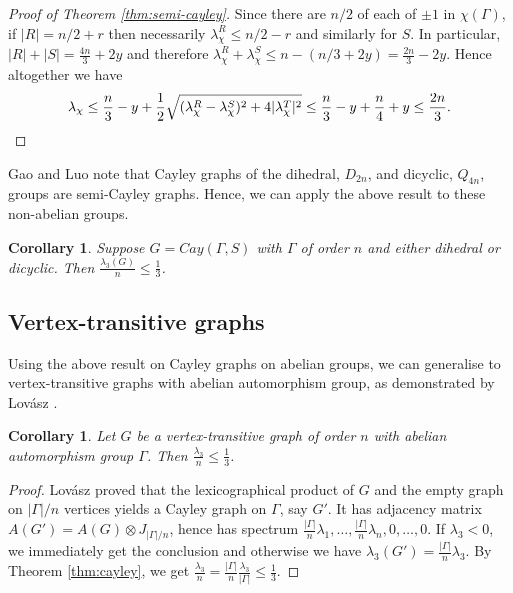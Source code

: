 \documentclass[12pt]{article}
\newtheorem{cor}[thm]{Corollary}
\begin{document}
\begin{proof}[Proof of Theorem \ref{thm:semi-cayley}]
    Since there are $n/2$ of each of $\pm 1$ in $\chi(\Gamma)$, if $|R| = n/2+r$ then necessarily $\lambda_\chi^R \le n/2-r$ and similarly for $S$. In particular, $|R| + |S| = \frac{4n}{3} + 2y$ and therefore $\lambda_\chi^R + \lambda_\chi^S \le n - (n/3 + 2y) = \frac{2n}{3} - 2y$. Hence altogether we have
    \[\lambda_\chi \le \frac{n}{3} - y + \frac12 \sqrt{(\lambda_\chi^R - \lambda_\chi^S)^2 + 4|\lambda_\chi^T|^2} \le \frac{n}{3} - y + \frac{n}{4} + y \le \frac{2n}{3}.\qedhere\] 
\end{proof}

Gao and Luo \cite{GaoSemiCayley} note that Cayley graphs of the dihedral, $D_{2n}$, and dicyclic, $Q_{4n}$, groups are semi-Cayley graphs. Hence, we can apply the above result to these non-abelian groups.

\begin{cor}\label{cor:dihedral}
    Suppose $G = Cay(\Gamma, S)$ with $\Gamma$ of order $n$ and either dihedral or dicyclic. Then $\frac{\lambda_3(G)}{n} \le \frac13$. 
\end{cor}

\subsection{Vertex-transitive graphs}

Using the above result on Cayley graphs on abelian groups, we can generalise to vertex-transitive graphs with abelian automorphism group, as demonstrated by Lov\'{a}sz \cite{LovaszTransitive}. 

\begin{cor}\label{cor:vertex-transitive}
    Let $G$ be a vertex-transitive graph of order $n$ with abelian automorphism group $\Gamma$. Then $\frac{\lambda_3}{n} \le \frac13$. 
\end{cor}
\begin{proof}
    Lov\'{a}sz \cite{LovaszTransitive} proved that the lexicographical product of $G$ and the empty graph on $|\Gamma|/n$ vertices yields a Cayley graph on $\Gamma$, say $G'$. It has adjacency matrix $A(G') = A(G) \otimes J_{|\Gamma|/n}$, hence has spectrum $\frac{|\Gamma|}{n} \lambda_1, \dots, \frac{|\Gamma|}{n} \lambda_n, 0, \dots, 0$. If $\lambda_3 < 0$, we immediately get the conclusion and otherwise we have $\lambda_3(G') = \frac{|\Gamma|}{n} \lambda_3$. By Theorem \ref{thm:cayley}, we get $\frac{\lambda_3}{n} = \frac{|\Gamma|}{n} \frac{\lambda_3}{|\Gamma|} \le \frac13$. 
\end{proof}
\end{document}
